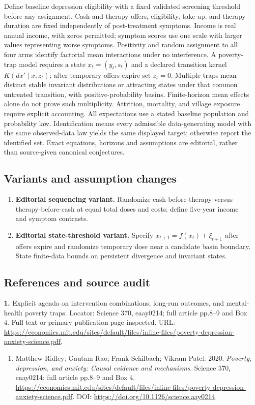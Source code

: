 \documentclass[11pt,a4paper]{article}
\begin{document}
Define baseline depression eligibility with a fixed validated screening threshold before any assignment. Cash and therapy offers, eligibility, take-up, and therapy duration are fixed independently of post-treatment symptoms. Income is real annual income, with zeros permitted; symptom scores use one scale with larger values representing worse symptoms. Positivity and random assignment to all four arms identify factorial mean interactions under no interference. A poverty-trap model requires a state \(x_t=(y_t,s_t)\) and a declared transition kernel \(K(dx'\mid x,z_t)\); after temporary offers expire set \(z_t=0\). Multiple traps mean distinct stable invariant distributions or attracting states under that common untreated transition, with positive-probability basins. Finite-horizon mean effects alone do not prove such multiplicity. Attrition, mortality, and village exposure require explicit accounting. All expectations use a stated baseline population and probability law. Identification means every admissible data-generating model with the same observed-data law yields the same displayed target; otherwise report the identified set. Exact equations, horizons and assumptions are editorial, rather than source-given canonical conjectures.
\subsection*{Variants and assumption changes}
\begin{enumerate}
\item \textbf{Editorial sequencing variant.} Randomize cash-before-therapy versus therapy-before-cash at equal total doses and costs; define five-year income and symptom contrasts.
\item \textbf{Editorial state-threshold variant.} Specify \(x_{t+1}=f(x_t)+\xi_{t+1}\) after offers expire and randomize temporary dose near a candidate basin boundary. State finite-data bounds on persistent divergence and invariant states.
\end{enumerate}
\subsection*{References and source audit}
\textbf{1.} Explicit agenda on intervention combinations, long-run outcomes, and mental-health poverty traps. Locator: Science 370, eaay0214; full article pp.8–9 and Box 4. Full text or primary publication page inspected. URL: \url{https://economics.mit.edu/sites/default/files/inline-files/poverty-depression-anxiety-science.pdf}.
\begin{enumerate}\raggedright
\item\hypertarget{definitions:source:30007730:1}{} Matthew Ridley; Gautam Rao; Frank Schilbach; Vikram Patel. 2020. \emph{Poverty, depression, and anxiety: Causal evidence and mechanisms}. Science 370, eaay0214; full article pp.8–9 and Box 4.
\url{https://economics.mit.edu/sites/default/files/inline-files/poverty-depression-anxiety-science.pdf}.
DOI: \url{https://doi.org/10.1126/science.aay0214}.
\end{enumerate}
\end{document}
